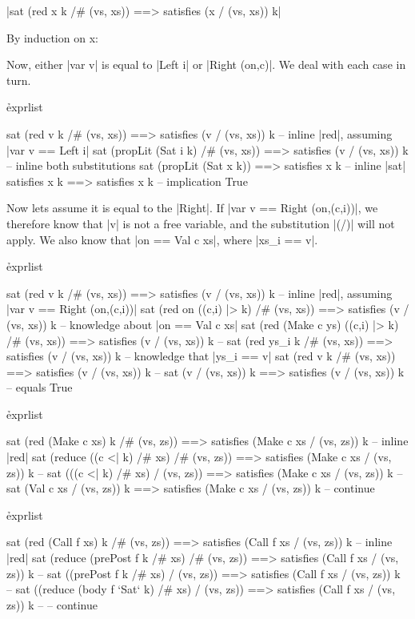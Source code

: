 
{|sat (red x k /# (vs, xs)) ==> satisfies (x / (vs, xs)) k|}

By induction on x:


Now, either |var v| is equal to |Left i| or |Right (on,c)|. We deal with each case in turn.

\h{exprlist}\begin{code}
sat (red v k /# (vs, xs)) ==> satisfies (v / (vs, xs)) k
    -- inline |red|, assuming |var v == Left i|
sat (propLit (Sat i k) /# (vs, xs)) ==> satisfies (v / (vs, xs)) k
    -- inline both substitutions
sat (propLit (Sat x k)) ==> satisfies x k
    -- inline |sat|
satisfies x k ==> satisfies x k
    -- implication
True
\end{code}

Now lets assume it is equal to the |Right|. If |var v == Right (on,(c,i))|, we therefore know that |v| is not a free variable, and the substitution |(/)| will not apply. We also know that |on == Val c xs|, where |xs_i == v|.

\h{exprlist}\begin{code}
sat (red v k /# (vs, xs)) ==> satisfies (v / (vs, xs)) k
    -- inline |red|, assuming |var v == Right (on,(c,i))|
sat (red on ((c,i) |> k) /# (vs, xs)) ==> satisfies (v / (vs, xs)) k
    -- knowledge about |on == Val c xs|
sat (red (Make c ys) ((c,i) |> k) /# (vs, xs)) ==> satisfies (v / (vs, xs)) k
    -- \lemma{| ||> |}
sat (red ys_i k /# (vs, xs)) ==> satisfies (v / (vs, xs)) k
    -- knowledge that |ys_i == v|
sat (red v k /# (vs, xs)) ==> satisfies (v / (vs, xs)) k
    -- 
sat (v / (vs, xs)) k ==> satisfies (v / (vs, xs)) k
    -- equals
True
\end{code}


\h{exprlist}\begin{code}
sat (red (Make c xs) k /# (vs, zs)) ==> satisfies (Make c xs / (vs, zs)) k
    -- inline |red|
sat (reduce ((c <| k) /# xs) /# (vs, zs)) ==> satisfies (Make c xs / (vs, zs)) k
    -- 
sat (((c <| k) /# xs) / (vs, zs)) ==> satisfies (Make c xs / (vs, zs)) k
    -- 
sat (Val c xs / (vs, zs)) k ==> satisfies (Make c xs / (vs, zs)) k
    -- continue
\end{code}


\h{exprlist}\begin{code}
sat (red (Call f xs) k /# (vs, zs)) ==> satisfies (Call f xs / (vs, zs)) k
    -- inline |red|
sat (reduce (prePost f k /# xs) /# (vs, zs)) ==> satisfies (Call f xs / (vs, zs)) k
    -- 
sat ((prePost f k /# xs) / (vs, zs)) ==> satisfies (Call f xs / (vs, zs)) k
    -- 
sat ((reduce (body f `Sat` k) /# xs) / (vs, zs)) ==> satisfies (Call f xs / (vs, zs)) k
    -- 
    -- continue
\end{code}

